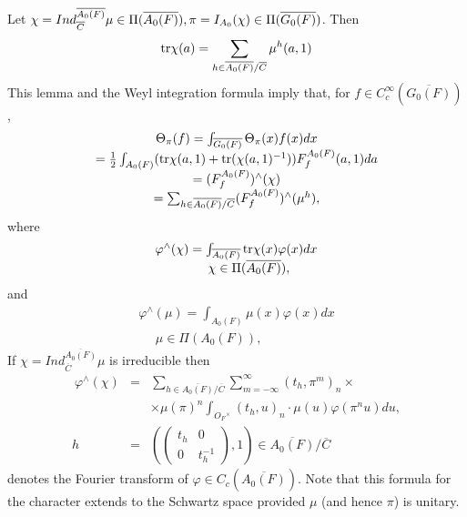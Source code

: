 Let $\chi =Ind_{\overline{C}}^{\overline{A_0(F)}}\mu \in \Pi (\overline{%
A_0(F)}),\pi =I_{A_0}(\chi )\in \Pi (\overline{G_0(F)})$. Then 
\begin{equation}
{\rm tr}\chi (a)=\sum_{h\in \overline{A_0(F)}/\overline{C}}\mu ^h(a,1)
\end{equation}
This lemma and the Weyl integration formula imply that, for $f\in C_c^\infty
(\overline{G_0(F)})$, 
\begin{equation}
\begin{array}{c}
\Theta _\pi (f)=\int_{\overline{G_0(F)}}\Theta _\pi (x)f(x)dx \\ 
=\frac 12\int_{A_0(F)}({\rm tr}\chi (a,1)+{\rm tr}(\chi
(a,1)^{-1}))F_f^{A_0(F)}(a,1)da \\ 
=(F_f^{A_0(F)})^{\wedge }(\chi ) \\ 
=\sum_{h\in \overline{A_0(F)}/\overline{C}}(F_f^{A_0(F)})^{\wedge }(\mu ^h),
\end{array}
\end{equation}
where 
\begin{equation}
\begin{array}{c}
\varphi ^{\wedge }(\chi )=\int_{\overline{A_0(F)}}{\rm tr}\chi (x)\varphi
(x)dx \\ 
\ \ \ \ \ \ \chi \in \Pi (\overline{A_0(F)}),
\end{array}
\end{equation}
and 
\begin{equation}
\begin{array}{c}
\varphi ^{\wedge }(\mu )=\int_{A_0(F)}\mu (x)\varphi (x)dx \\ 
\ \ \ \ \ \ \mu \in \Pi (A_0(F)),
\end{array}
\end{equation}
If $\chi =Ind_{\overline{C}}^{\overline{A_0(F)}}\mu $ is irreducible then 
\begin{eqnarray}
\ \varphi ^{\wedge }(\chi ) &=&\sum_{h\in \overline{A_0(F)}/\overline{C}%
}\sum_{m=-\infty }^\infty (t_h,\pi ^m)_n\times \\
&&\times \mu (\pi )^n\int_{O_F{}^{\times }}(t_h,u)_n\cdot \mu (u)\varphi
(\pi ^nu)du, \\
h &=&(\left( 
\begin{array}{cc}
t_h & 0 \\ 
0 & t_h^{-1}
\end{array}
\right) ,1)\in \overline{A_0(F)}/\overline{C}  \nonumber
\end{eqnarray}
denotes the Fourier transform of $\varphi \in C_c(\overline{A_0(F)}).$ Note
that this formula for the character extends to the Schwartz space provided $%
\mu $ (and hence $\pi $) is unitary.

